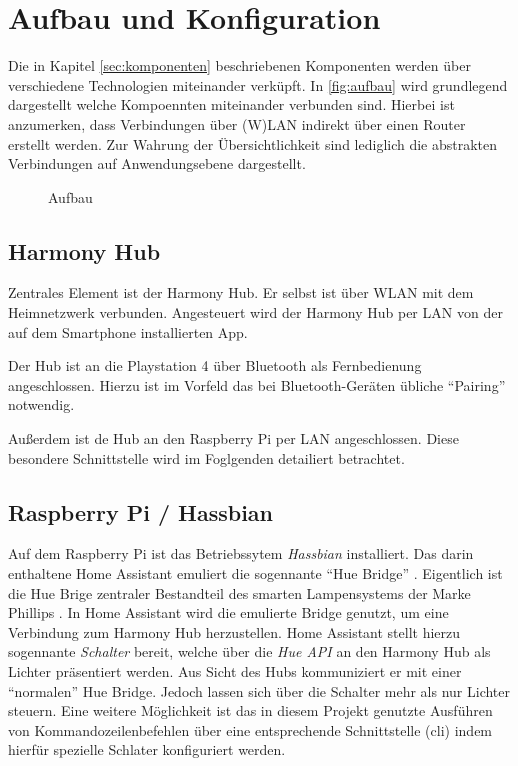 \newpage
\section{Aufbau und Konfiguration}\label{sec:aufbau}
Die in Kapitel \ref{sec:komponenten} \textit{} beschriebenen Komponenten werden über verschiedene Technologien miteinander verküpft.
In \autoref{fig:aufbau} wird grundlegend dargestellt welche Kompoennten miteinander verbunden sind.
Hierbei ist anzumerken, dass Verbindungen über (W)LAN indirekt über einen Router erstellt werden.
Zur Wahrung der Übersichtlichkeit sind lediglich die abstrakten Verbindungen auf Anwendungsebene dargestellt.

\begin{figure}[ht!]
    \centering
    \resizebox{\textwidth}{!}{
        
    }
    \caption{Aufbau}
    \label{fig:aufbau}
\end{figure}

\subsection{Harmony Hub}\label{sec:aufbau-hub}
Zentrales Element ist der Harmony Hub.
Er selbst ist über WLAN mit dem Heimnetzwerk verbunden.
Angesteuert wird der Harmony Hub per LAN von der auf dem Smartphone installierten App.

Der Hub ist an die Playstation 4 über Bluetooth als Fernbedienung angeschlossen.
Hierzu ist im Vorfeld das bei Bluetooth-Geräten übliche \enquote{Pairing} notwendig.

Außerdem ist de Hub an den Raspberry Pi per LAN angeschlossen.
Diese besondere Schnittstelle wird im Foglgenden detailiert betrachtet.

\subsection{Raspberry Pi / Hassbian}\label{sec:aufbau-hassbian}
Auf dem Raspberry Pi ist das Betriebssytem \textit{Hassbian} installiert.
Das darin enthaltene Home Assistant emuliert die sogennante \enquote{Hue Bridge} \cite{Emulated83:online}.
Eigentlich ist die Hue Brige zentraler Bestandteil des smarten Lampensystems der Marke Phillips \cite{HueBridg65:online}.
In Home Assistant wird die emulierte Bridge genutzt, um eine Verbindung zum Harmony Hub herzustellen.
Home Assistant stellt hierzu sogennante \textit{Schalter} bereit, welche über die \textit{Hue API} an den Harmony Hub als Lichter präsentiert werden.
Aus Sicht des Hubs kommuniziert er mit einer \enquote{normalen} Hue Bridge.
Jedoch lassen sich über die Schalter mehr als nur Lichter steuern.
Eine weitere Möglichkeit ist das in diesem Projekt genutzte Ausführen von Kommandozeilenbefehlen über eine entsprechende Schnittstelle (\ac{cli})
indem hierfür spezielle Schlater konfiguriert werden.

